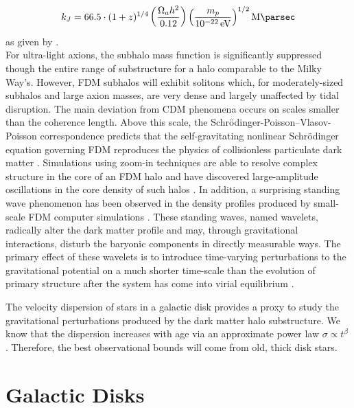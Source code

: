 \documentclass[usenatbib]{mnras}
\newcommand{\poweV}[1]{\SI{e#1}{\electronvolt}}
\begin{document}
\begin{equation}
k_J = 66.5 \cdot (1+z)^{1/4} \left( \frac{\Omega_a h^2}{0.12} \right) \left(\frac{m_p}{\poweV{-22}} \right)^{1/2} \si{\per\mega\parsec}
\end{equation}
\noindent
as given by \citet{axion_cosmology}. \\ For ultra-light axions, the subhalo mass function is significantly suppressed though the entire range of substructure for a halo comparable to the Milky Way’s. However, FDM subhalos will exhibit solitons which, for moderately-sized subhalos and large axion masses, are very dense and largely unaffected by tidal disruption. The main deviation from CDM phenomena occurs on scales smaller than the coherence length. Above this scale, the Schr\"{o}dinger-Poisson–Vlasov-Poisson correspondence predicts that the self-gravitating nonlinear Schr\"{o}dinger equation governing FDM reproduces the physics of collisionless particulate dark matter \citep{Schrodinger-Poisson}. Simulations using zoom-in techniques are able to resolve complex structure in the core of an FDM halo and have discovered large-amplitude oscillations in the core density of such halos \citep{structure-FDM-halos}. In addition, a surprising standing wave phenomenon has been observed in the density profiles produced by small-scale FDM computer simulations \citep{cold_and_fuzzy}. These standing waves, named wavelets, radically alter the dark matter profile and may, through gravitational interactions, disturb the baryonic components in directly measurable ways. The primary effect of these wavelets is to introduce time-varying perturbations to the gravitational potential on a much shorter time-scale than the evolution of primary structure after the system has come into virial equilibrium \citep{Schrodinger-Poisson}. 
\par
	The velocity dispersion of stars in a galactic disk provides a proxy to study the gravitational perturbations produced by the dark matter halo substructure. We know that the dispersion increases with age via an approximate power law $\sigma \propto t^\beta$ \citep{heating_history}. Therefore, the best observational bounds will come from old, thick disk stars.  

\section{Galactic Disks}
\end{document}
